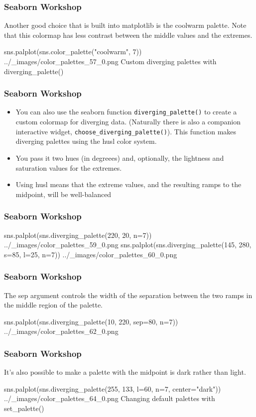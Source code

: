 \documentclass{beamer}
\begin{document}
\begin{frame}[fragile]
\frametitle{Seaborn Workshop}
\large


Another good choice that is built into matplotlib is the coolwarm palette. Note that this colormap has less contrast between the middle values and the extremes.

sns.palplot(sns.color_palette("coolwarm", 7))
../_images/color_palettes_57_0.png
Custom diverging palettes with diverging_palette()
\end{frame}
\begin{frame}[fragile]
\frametitle{Seaborn Workshop}
\large

\begin{itemize}
\item You can also use the seaborn function \texttt{diverging\_palette()} to create a custom colormap for diverging data. (Naturally there is also a companion interactive widget, \texttt{choose\_diverging\_palette()}). This function makes diverging palettes using the husl color system. 
\item You pass it two hues (in degreees) and, optionally, the lightness and saturation values for the extremes. 
\item Using husl means that the extreme values, and the resulting ramps to the midpoint, will be well-balanced

\end{itemize}
\end{frame}
\begin{frame}[fragile]
	\frametitle{Seaborn Workshop}
	\large
	
sns.palplot(sns.diverging_palette(220, 20, n=7))
../_images/color_palettes_59_0.png
sns.palplot(sns.diverging_palette(145, 280, s=85, l=25, n=7))
../_images/color_palettes_60_0.png
\end{frame}
\begin{frame}[fragile]
\frametitle{Seaborn Workshop}
\large


The sep argument controls the width of the separation between the two ramps in the middle region of the palette.

sns.palplot(sns.diverging_palette(10, 220, sep=80, n=7))
../_images/color_palettes_62_0.png
\end{frame}
\begin{frame}[fragile]
	\frametitle{Seaborn Workshop}
	\large
It’s also possible to make a palette with the midpoint is dark rather than light.

sns.palplot(sns.diverging_palette(255, 133, l=60, n=7, center="dark"))
../_images/color_palettes_64_0.png
Changing default palettes with set_palette()

\end{frame}
\end{document}
